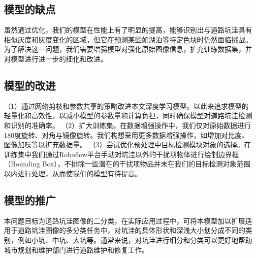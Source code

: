 \documentclass[a4paper, 10pt]{article}
\begin{document}
	
	\subsection{模型的缺点}
	
	虽然通过优化，我们的模型在性能上有了明显的提高，能够识别出与道路坑洼具有相似灰度和灰度变化的区域，但它在预测某些如湖泊等特定色块时仍然面临挑战。为了解决这一问题，我们需要增强模型对强化原始图像信息，扩充训练数据集，并对模型进行进一步的细化和改进。
	
	
	\subsection{模型的改进}

	（1）通过网络剪枝和参数共享的策略改进本文深度学习模型。以此来追求模型的轻量化和高效性，以减小模型的参数量和计算负担，同时确保模型对道路坑洼检测和识别的准确率。
	（2）扩大训练集。在数据增强操作中，我们仅对原始数据进行180度旋转、对角与镜像旋转。我们构想采用更多数据增强操作，如增加对比度、图像加噪等以扩充数据量。
	（3）尝试优化预处理中目标检测模块对象的选择。在训练集中我们通过Roboflow平台手动对坑洼以外的干扰项物体进行绘制边界框（Bounding Box），不排除一些潜在的干扰项物品并未在我们的目标检测对象范围以内进行处理，从而使我们的模型有待提高。
	
	
	\subsection{模型的推广}
	
	本问题目标为道路坑洼图像的二分类，在实际应用过程中，可将本模型加以扩展适用于道路坑洼图像的多分类任务中，对坑洼的具体形状和深浅大小划分成不同的类别，例如小坑、中坑、大坑等。通常来说，对坑洼进行细分和分类可以更好地帮助城市规划和维护部门进行道路维护和修复工作。
	
		
		
		
		
		
		
	
	
	
	
	
\end{document}
